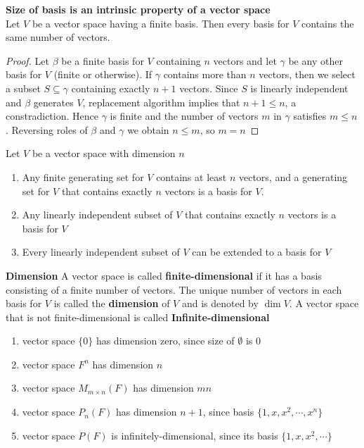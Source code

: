 \documentclass[11pt]{article}
\begin{document}
\begin{corollary*}
    \textbf{Size of basis is an intrinsic property of a vector space} \\ 
    Let $V$ be a vector space having a finite basis. Then every basis for $V$ contains the same number of vectors. 
    \begin{proof}
        Let $\beta$ be a finite basis for $V$ containing $n$ vectors and let $\gamma$ be any other basis for $V$ (finite or otherwise). If $\gamma$ contains more than $n$ vectors, then we select a subset $S\subseteq \gamma$ containing exactly $n+1$ vectors. Since $S$ is linearly independent and $\beta$ generates $V$, replacement algorithm implies that $n+1 \leq n$, a constradiction. Hence $\gamma$ is finite and the number of vectors $m$ in $\gamma$ satisfies $m\leq n$. Reversing roles of $\beta$ and $\gamma$ we obtain $n\leq m$, so $m=n$
    \end{proof}
\end{corollary*}

\begin{corollary*}
    Let $V$ be a vector space with dimension $n$
    \begin{enumerate}
        \item Any finite generating set for $V$ contains at least $n$ vectors, and a generating set for $V$ that contains exactly $n$ vectors is a basis for $V$. 
        \item Any linearly independent subset of $V$ that contains exactly $n$ vectors is a basis for $V$
        \item Every linearly independent subset of $V$ can be extended to a basis for $V$
    \end{enumerate}
\end{corollary*}

\begin{defn*}
    \textbf{Dimension} A vector space is called \textbf{finite-dimensional} if it has a basis consisting of a finite number of vectors. The unique number of vectors in each basis for $V$ is called the \textbf{dimension} of $V$ and is denoted by $\dim{V}$. A vector space that is not finite-dimensional is called \textbf{Infinite-dimensional}
    \begin{enumerate}
        \item vector space $\{0\}$ has dimension zero, since size of $\emptyset$ is 0
        \item vector space $F^n$ has dimension $n$
        \item vector space $M_{m\times n}(F)$ has dimension $mn$ 
        \item vector space $P_n(F)$ has dimension $n+1$, since basis $\{1, x, x^2, \cdots, x^n\}$
        \item vector space $P(F)$ is infinitely-dimensional, since its basis $\{1, x, x^2, \cdots \}$
    \end{enumerate}
\end{defn*}
\end{document}

